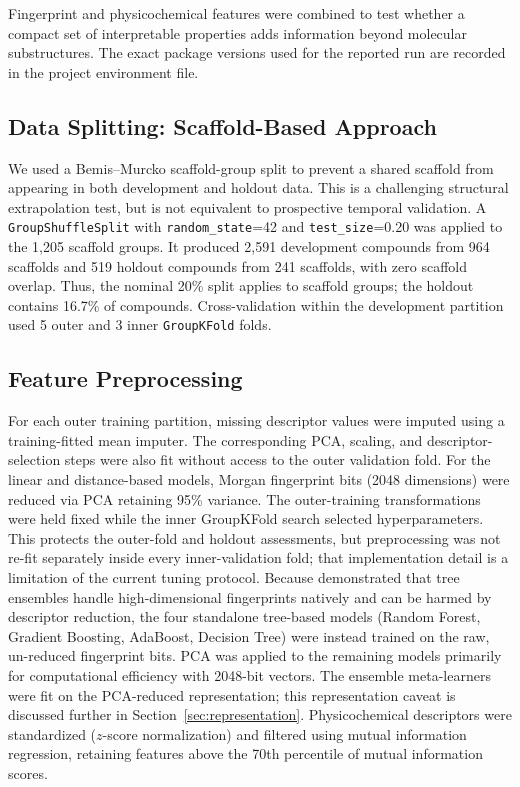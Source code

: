 \documentclass[11pt]{article}
\begin{document}
Fingerprint and physicochemical features were combined to test whether a compact set of
interpretable properties adds information beyond molecular substructures. The exact
package versions used for the reported run are recorded in the project environment file.

\subsection{Data Splitting: Scaffold-Based Approach}

We used a Bemis--Murcko scaffold-group split \citep{bemis1996properties} to prevent a
shared scaffold from appearing in both development and holdout data. This is a challenging
structural extrapolation test, but is not equivalent to prospective temporal validation.
A \texttt{GroupShuffleSplit} with \texttt{random\_state}=42 and
\texttt{test\_size}=0.20 was applied to the 1,205 scaffold groups. It produced 2,591
development compounds from 964 scaffolds and 519 holdout compounds from 241 scaffolds,
with zero scaffold overlap. Thus, the nominal 20\% split applies to scaffold groups; the
holdout contains 16.7\% of compounds. Cross-validation within the development partition
used 5 outer and 3 inner \texttt{GroupKFold} folds.

\subsection{Feature Preprocessing}

For each outer training partition, missing descriptor values were imputed using a
training-fitted mean imputer. The corresponding PCA, scaling, and descriptor-selection
steps were also fit without access to the outer validation fold. For the linear and
distance-based models, Morgan fingerprint bits (2048 dimensions) were reduced via PCA
retaining 95\% variance. The outer-training transformations were held fixed while the
inner GroupKFold search selected hyperparameters. This protects the outer-fold and holdout
assessments, but preprocessing was not re-fit separately inside every inner-validation
fold; that implementation detail is a limitation of the current tuning protocol.
Because \citet{svetnik2003random} demonstrated that tree ensembles handle high-dimensional
fingerprints natively and can be harmed by descriptor reduction, the four standalone
tree-based models (Random Forest, Gradient Boosting, AdaBoost, Decision Tree) were instead
trained on the raw, un-reduced fingerprint bits.
PCA was applied to the remaining models primarily for computational efficiency with
2048-bit vectors.
The ensemble meta-learners were fit on the PCA-reduced representation; this representation
caveat is discussed further in Section~\ref{sec:representation}.
Physicochemical descriptors were standardized ($z$-score normalization) and filtered
using mutual information regression, retaining features above the 70th percentile
of mutual information scores.
\end{document}
